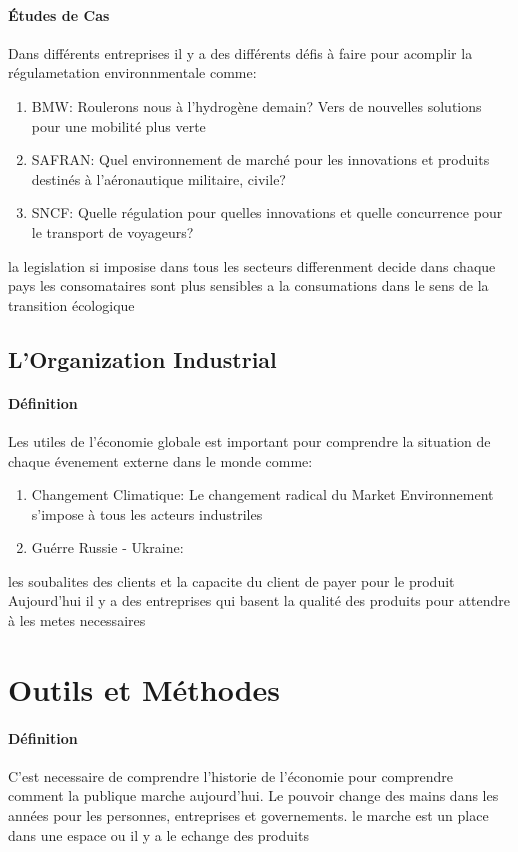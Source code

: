 \documentclass{article}
\begin{document}
\paragraph{Études de Cas}Dans différents entreprises il y a des différents défis à faire pour acomplir la régulametation environnmentale comme:
\begin{enumerate}
    \item BMW: Roulerons nous à l'hydrogène demain? Vers de nouvelles solutions pour une mobilité plus verte
    \item SAFRAN: Quel environnement de marché pour les innovations et produits destinés à l'aéronautique militaire, civile?
    \item SNCF: Quelle régulation pour quelles innovations et quelle concurrence pour le transport de voyageurs?
\end{enumerate}

la legislation si imposise dans tous les secteurs differenment decide dans chaque pays
les consomataires sont plus sensibles a la consumations dans le sens de la transition écologique

\subsection{L'Organization Industrial}
\paragraph{Définition}Les utiles de l'économie globale est important pour comprendre la situation de chaque évenement externe dans le monde comme:
\begin{enumerate}
    \item Changement Climatique: Le changement radical du Market Environnement s'impose à tous les acteurs industriles
    \item Guérre Russie - Ukraine:
\end{enumerate}

les soubalites des clients et la capacite du client de payer pour le produit
Aujourd'hui il y a des entreprises qui basent la qualité des produits pour attendre à les metes necessaires


\newpage\section{Outils et Méthodes}
\paragraph{Définition}C'est necessaire de comprendre l'historie de l'économie pour comprendre comment la publique marche aujourd'hui. Le pouvoir change des mains dans les années pour les personnes, entreprises et governements.
le marche est un place dans une espace ou il y a le echange des produits
\end{document}

